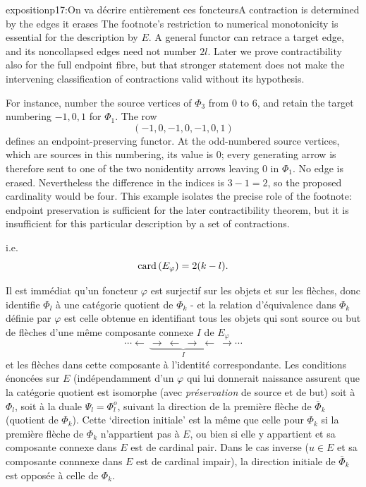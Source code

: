 \begin{dcomment}{exposition}{p17:On va décrire entièrement ces foncteurs}{A contraction is determined by the edges it erases}
The footnote's restriction to numerical monotonicity is essential for the description by $E$. A general functor can retrace a target edge, and its noncollapsed edges need not number $2l$. Later we prove contractibility also for the full endpoint fibre, but that stronger statement does not make the intervening classification of contractions valid without its hypothesis.

For instance, number the source vertices of $\Phi_3$ from $0$ to $6$, and retain the target numbering $-1,0,1$ for $\Phi_1$. The row
\[
 (-1,0,-1,0,-1,0,1)
\]
defines an endpoint-preserving functor. At the odd-numbered source vertices, which are sources in this numbering, its value is $0$; every generating arrow is therefore sent to one of the two nonidentity arrows leaving $0$ in $\Phi_1$. No edge is erased. Nevertheless the difference in the indices is $3-1=2$, so the proposed cardinality would be four. This example isolates the precise role of the footnote: endpoint preservation is sufficient for the later contractibility theorem, but it is insufficient for this particular description by a set of contractions.
\end{dcomment}


i.e.
\[
\mathrm{card}\,(E_\varphi)=2(k-l).
\]



Il est immédiat qu'un foncteur $\varphi$ est surjectif sur les objets et sur les flèches, donc identifie $\Phi_l$ à une catégorie quotient de $\Phi_k$ - et la relation d'équivalence dans $\Phi_k$ définie par $\varphi$ est celle obtenue en identifiant tous les objets qui sont source ou but de flèches d'une même composante connexe $I$ de $E_\varphi$
\[
\cdots\longleftarrow\ \underbrace{\longrightarrow\ \longleftarrow\ \longrightarrow\ \longleftarrow}_{I}\ \longrightarrow\cdots
\]
et les flèches dans cette composante à l'identité correspondante. Les conditions énoncées sur $E$ (indépendamment d'un $\varphi$ qui lui donnerait naissance assurent que la catégorie quotient est isomorphe (avec \textit{préservation} de source et de but) soit à $\Phi_l$, soit à la duale $\Psi_l=\Phi_l^o$, suivant la direction de la première flèche de $\bar{\Phi}_k$ (quotient de $\Phi_k$). Cette `direction initiale' est la même que celle pour $\Phi_k$ si la première flèche de $\Phi_k$ n'appartient pas à $E$, ou bien si elle y appartient et sa composante connexe dans $E$ est de cardinal pair. Dans le cas inverse ($u\in E$ et sa composante connnexe dans $E$ est de cardinal impair), la direction initiale de $\bar{\Phi}_k$ est opposée à celle de $\Phi_k$. %

